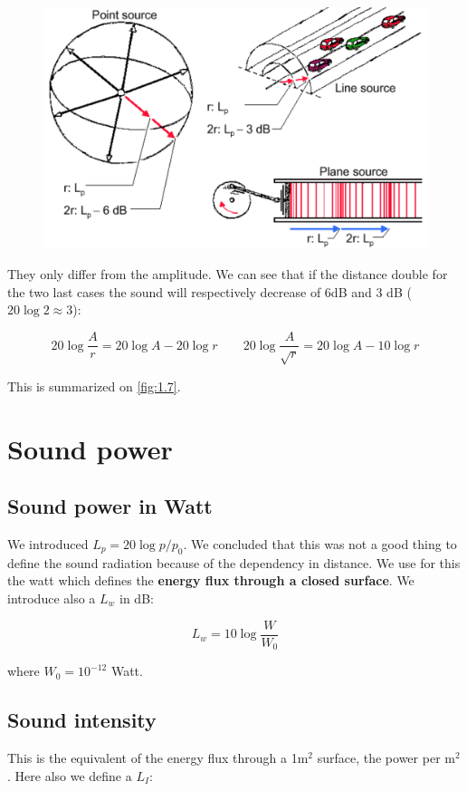 	\begin{figure}
	\vspace{-5mm}
	\includegraphics[scale=0.15]{acoustics/ch1/7}
	\label{fig:1.7}
	\end{figure}
	They only differ from the amplitude. We can see that if the distance double for the two last cases the sound will respectively decrease of 6dB and 3 dB ($20\log 2\approx 3$):
	
	\begin{equation}
	20\log \frac{A}{r} = 20 \log A - 20 \log r \qquad 20\log \frac{A}{\sqrt{r}} = 20 \log A - 10 \log r
	\end{equation}
	
	This is summarized on \autoref{fig:1.7}.
	
\section{Sound power}
\subsection{Sound power in Watt}
	We introduced $L_p = 20 \log p/p_0$. We concluded that this was not a good thing to define the sound radiation because of the dependency in distance. We use for this the watt which defines the \textbf{energy flux through a closed surface}. We introduce also a $L_w$ in dB:
	
	\begin{equation}
	L_w = 10\log \frac{W}{W_0}
	\end{equation}	 
	
	where $W_0 = 10^{-12}$ Watt.
	
\subsection{Sound intensity}
	This is the equivalent of the energy flux through a 1m$^2$ surface, the power per m$^2$. Here also we define a $L_I$:
	
